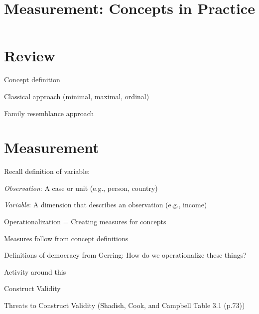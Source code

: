 
\usepackage{tikz}
\usetikzlibrary{shapes,arrows}

\title{Measurement: Concepts in Practice}


\date[]{}



\frame{\titlepage}

\frame{\tableofcontents}


\section{Review}
\frame{\tableofcontents[currentsection]}


Concept definition

Classical approach (minimal, maximal, ordinal)

Family resemblance approach





\section{Measurement}
\frame{\tableofcontents[currentsection]}

Recall definition of variable:

\item \textit{Observation}: A case or unit (e.g., person, country)
\item \textit{Variable}: A dimension that describes an observation (e.g., income)



Operationalization = Creating measures for concepts






Measures follow from concept definitions

Definitions of democracy from Gerring: How do we operationalize these things?



Activity around this



Construct Validity



Threats to Construct Validity (Shadish, Cook, and Campbell Table 3.1 (p.73))

